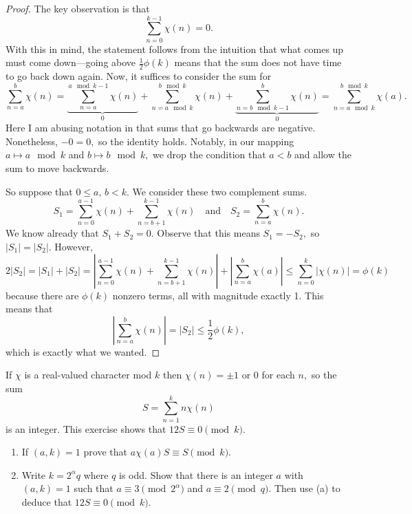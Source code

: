 \begin{proof}
The key observation is that
\[\sum_{n=0}^{k-1}\chi(n)=0.\]
With this in mind, the statement follows from the intuition that what comes up must come down---going above $\frac12\phi(k)$ means that the sum does not have time to go back down again. Now, it suffices to consider the sum for
\[\sum_{n=a}^b\chi(n)=\underbrace{\sum_{n=a}^{a\mod k-1}\chi(n)}_0+\sum_{n=a\mod k}^{b\mod k}\chi(n)+\underbrace{\sum_{n=b\mod k-1}^b\chi(n)}_0=\sum_{n=a\mod k}^{b\mod k}\chi(a).\]
Here I am abusing notation in that sums that go backwards are negative. Nonetheless, $-0=0,$ so the identity holds. Notably, in our mapping $a\mapsto a\mod k$ and $b\mapsto b\mod k,$ we drop the condition that $a<b$ and allow the sum to move backwards.

So suppose that $0\le a,\,b<k.$ We consider these two complement sums.
\[S_1=\sum_{n=0}^{a-1}\chi(n)+\sum_{n=b+1}^{k-1}\chi(n)\quad\text{and}\quad S_2=\sum_{n=a}^b\chi(n).\]
We know already that $S_1+S_2=0.$ Observe that this means $S_1=-S_2,$ so $|S_1|=|S_2|.$ However,
\[2|S_2|=|S_1|+|S_2|=\left|\sum_{n=0}^{a-1}\chi(n)+\sum_{n=b+1}^{k-1}\chi(n)\right|+\left|\sum_{n=a}^b\chi(a)\right|\le\sum_{n=0}^k|\chi(n)|=\phi(k)\]
because there are $\phi(k)$ nonzero terms, all with magnitude exactly 1. This means that
\[\left|\sum_{n=a}^b\chi(n)\right|=|S_2|\le\frac12\phi(k),\]
which is exactly what we wanted.
\end{proof}

\begin{exercise}
If $\chi$ is a real-valued character mod $k$ then $\chi(n)=\pm1$ or 0 for each $n,$ so the sum
\[S=\sum_{n=1}^kn\chi(n)\]
is an integer. This exercise shows that $12S\equiv0\pmod k.$
\begin{enumerate}[label=(\alph*)]
    \item If $(a,k)=1$ prove that $a\chi(a)S\equiv S\pmod k.$
    \item Write $k=2^\alpha q$ where $q$ is odd. Show that there is an integer $a$ with $(a,k)=1$ such that $a\equiv3\pmod{2^\alpha}$ and $a\equiv2\pmod q.$ Then use (a) to deduce that $12S\equiv0\pmod k.$
\end{enumerate}
\end{exercise}

